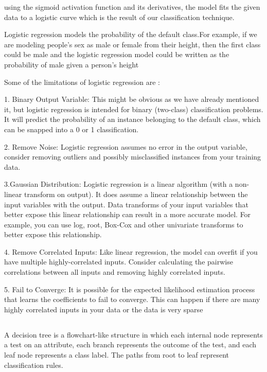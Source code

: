 \documentclass[12pt]{article}
\newcommand{\msize}{\fontsize{14pt}{12pt}\selectfont}
\begin{document}
using the sigmoid activation function and its derivatives, the model fits the given data to a logistic curve which is the result of our classification technique. 

Logistic regression models the probability of the default class.For example, if we are modeling people’s sex as male or female from their height, then the first class could be male and the logistic regression model could be written as the probability of male given a person’s height

Some of the limitations of logistic regression are : 

1. Binary Output Variable: This might be obvious as we have already mentioned it, but logistic regression is intended for binary (two-class) classification problems. It will predict the probability of an instance belonging to the default class, which can be snapped into a 0 or 1 classification.

2. Remove Noise: Logistic regression assumes no error in the output variable, consider removing outliers and possibly misclassified instances from your training data.

3.Gaussian Distribution: Logistic regression is a linear algorithm (with a non-linear transform on output). It does assume a linear relationship between the input variables with the output. Data transforms of your input variables that better expose this linear relationship can result in a more accurate model. For example, you can use log, root, Box-Cox and other univariate transforms to better expose this relationship.

4. Remove Correlated Inputs: Like linear regression, the model can overfit if you have multiple highly-correlated inputs. Consider calculating the pairwise correlations between all inputs and removing highly correlated inputs. 

5. Fail to Converge: It is possible for the expected likelihood estimation process that learns the coefficients to fail to converge. This can happen if there are many highly correlated inputs in your data or the data is very sparse 
\newpage
\subsection{\msize{\textbf{DECISION TREES}}}
A decision tree is a flowchart-like structure in which each internal node represents a test on an attribute, each branch represents the outcome of the test, and each leaf node represents a class label. The paths from root to leaf represent classification rules.
\end{document}
